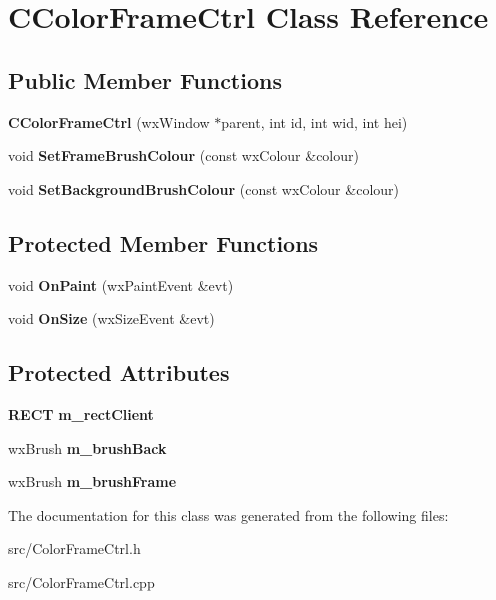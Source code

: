 \section{CColorFrameCtrl Class Reference}
\label{classCColorFrameCtrl}
\subsection*{Public Member Functions}
\begin{DoxyCompactItemize}
\item 
{\bfseries CColorFrameCtrl} (wxWindow $\ast$parent, int id, int wid, int hei)\label{classCColorFrameCtrl_aaa671a431563d29b45859cd7011fade0}

\item 
void {\bfseries SetFrameBrushColour} (const wxColour \&colour)\label{classCColorFrameCtrl_abb76f55f60f47808938b31c8754940f4}

\item 
void {\bfseries SetBackgroundBrushColour} (const wxColour \&colour)\label{classCColorFrameCtrl_a5e4f7a8f7fae0910be84f6333d18b599}

\end{DoxyCompactItemize}
\subsection*{Protected Member Functions}
\begin{DoxyCompactItemize}
\item 
void {\bfseries OnPaint} (wxPaintEvent \&evt)\label{classCColorFrameCtrl_a8881fb0d690a53604fe495b7a82a5db5}

\item 
void {\bfseries OnSize} (wxSizeEvent \&evt)\label{classCColorFrameCtrl_a51c2155a339993ba3724f26211cb4224}

\end{DoxyCompactItemize}
\subsection*{Protected Attributes}
\begin{DoxyCompactItemize}
\item 
{\bf RECT} {\bfseries m\_\-rectClient}\label{classCColorFrameCtrl_ac6ede42559e24e3038687e7317225ab9}

\item 
wxBrush {\bfseries m\_\-brushBack}\label{classCColorFrameCtrl_a0b358ab2e56404996b464a718666ecd7}

\item 
wxBrush {\bfseries m\_\-brushFrame}\label{classCColorFrameCtrl_abea77be00fb4166bca2d80d66e87d64f}

\end{DoxyCompactItemize}


The documentation for this class was generated from the following files:\begin{DoxyCompactItemize}
\item 
src/ColorFrameCtrl.h\item 
src/ColorFrameCtrl.cpp\end{DoxyCompactItemize}
